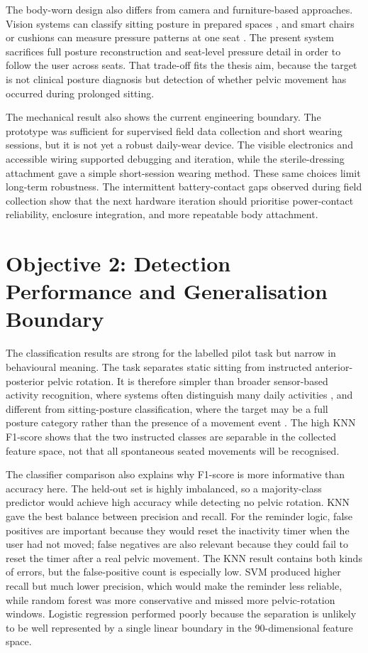 The body-worn design also differs from camera and furniture-based approaches. Vision systems can classify sitting posture in prepared spaces \cite{estrada2023machine}, and smart chairs or cushions can measure pressure patterns at one seat \cite{tan2001sensing,ma2017activity}. The present system sacrifices full posture reconstruction and seat-level pressure detail in order to follow the user across seats. That trade-off fits the thesis aim, because the target is not clinical posture diagnosis but detection of whether pelvic movement has occurred during prolonged sitting.

The mechanical result also shows the current engineering boundary. The prototype was sufficient for supervised field data collection and short wearing sessions, but it is not yet a robust daily-wear device. The visible electronics and accessible wiring supported debugging and iteration, while the sterile-dressing attachment gave a simple short-session wearing method. These same choices limit long-term robustness. The intermittent battery-contact gaps observed during field collection show that the next hardware iteration should prioritise power-contact reliability, enclosure integration, and more repeatable body attachment.

\section{Objective 2: Detection Performance and Generalisation Boundary}

The classification results are strong for the labelled pilot task but narrow in behavioural meaning. The task separates static sitting from instructed anterior-posterior pelvic rotation. It is therefore simpler than broader sensor-based activity recognition, where systems often distinguish many daily activities \cite{trabelsi2022sensor}, and different from sitting-posture classification, where the target may be a full posture category rather than the presence of a movement event \cite{kappattanavar2021monitoring}. The high KNN F1-score shows that the two instructed classes are separable in the collected feature space, not that all spontaneous seated movements will be recognised.

The classifier comparison also explains why F1-score is more informative than accuracy here. The held-out set is highly imbalanced, so a majority-class predictor would achieve high accuracy while detecting no pelvic rotation. KNN gave the best balance between precision and recall. For the reminder logic, false positives are important because they would reset the inactivity timer when the user had not moved; false negatives are also relevant because they could fail to reset the timer after a real pelvic movement. The KNN result contains both kinds of errors, but the false-positive count is especially low. SVM produced higher recall but much lower precision, which would make the reminder less reliable, while random forest was more conservative and missed more pelvic-rotation windows. Logistic regression performed poorly because the separation is unlikely to be well represented by a single linear boundary in the 90-dimensional feature space.

